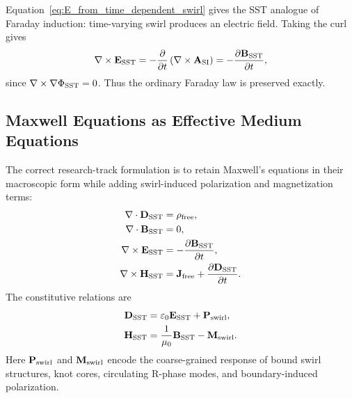     Equation~\eqref{eq:E_from_time_dependent_swirl} gives the SST analogue of
    Faraday induction: time-varying swirl produces an electric field.  Taking
    the curl gives
    \begin{equation}
        \nabla\times\mathbf{E}_{\rm SST}
        =
        -
        \frac{\partial}{\partial t}
        \left(
            \nabla\times\mathbf{A}_{\rm SI}
        \right)
        =
        -
        \frac{\partial\mathbf{B}_{\rm SST}}{\partial t},
        \label{eq:faraday_from_swirl}
    \end{equation}
    since \(\nabla\times\nabla\Phi_{\rm SST}=0\).  Thus the ordinary Faraday
    law is preserved exactly.

\subsection{Maxwell Equations as Effective Medium Equations}
    
    The correct research-track formulation is to retain Maxwell's equations
    in their macroscopic form while adding swirl-induced polarization and
    magnetization terms:
    \begin{align}
        \nabla\cdot\mathbf{D}_{\rm SST}
        &=
        \rho_{\rm free},
        \label{eq:SST_gauss_D}
        \\
        \nabla\cdot\mathbf{B}_{\rm SST}
        &=
        0,
        \label{eq:SST_gauss_B}
        \\
        \nabla\times\mathbf{E}_{\rm SST}
        &=
        -
        \frac{\partial\mathbf{B}_{\rm SST}}{\partial t},
        \label{eq:SST_faraday}
        \\
        \nabla\times\mathbf{H}_{\rm SST}
        &=
        \mathbf{J}_{\rm free}
        +
        \frac{\partial\mathbf{D}_{\rm SST}}{\partial t}.
        \label{eq:SST_ampere}
    \end{align}
    The constitutive relations are
    \begin{align}
        \mathbf{D}_{\rm SST}
        &=
        \varepsilon_0\mathbf{E}_{\rm SST}
        +
        \mathbf{P}_{\rm swirl},
        \label{eq:D_constitutive_swirl}
        \\
        \mathbf{H}_{\rm SST}
        &=
        \frac{1}{\mu_0}\mathbf{B}_{\rm SST}
        -
        \mathbf{M}_{\rm swirl}.
        \label{eq:H_constitutive_swirl}
    \end{align}
    Here \(\mathbf{P}_{\rm swirl}\) and \(\mathbf{M}_{\rm swirl}\) encode the
    coarse-grained response of bound swirl structures, knot cores, circulating
    R-phase modes, and boundary-induced polarization.
    
